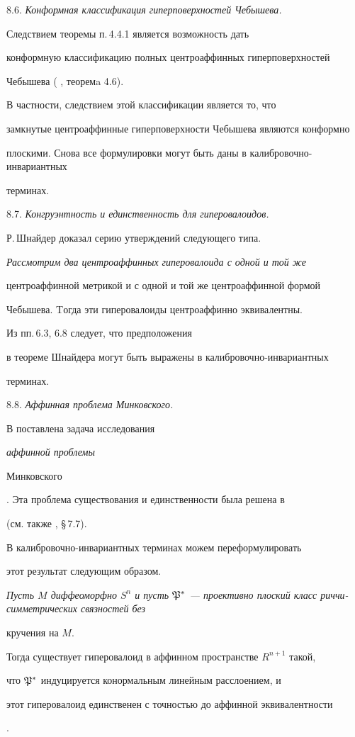 \medskip



8.6. {\it Конформная классификация гиперповерхностей Чебышева.}

Следствием теоремы п.\,4.4.1 является возможность дать

конформную классификацию полных центроаффинных гиперповерхностей

Чебышева ( \cite{LIU-S-W}, теоремa 4.6).

В частности, следствием этой классификации является то, что

замкнутые центроаффинные гиперповерхности Чебышева являются конформно

плоскими. Снова все формулировки могут быть даны в калибровочно-инвариантных

терминах.

\medskip



8.7. {\it Конгруэнтность и единственность для гиперовалоидов.}

Р.\,Шнайдер \cite {SCHN} доказал серию утверждений следующего типа.

{\it Рассмотрим два центроаффинных гиперовалоида с одной и той же

центроаффинной метрикой и с одной и той же центроаффинной формой

Чебышева. Tогда эти гиперовалоиды центроаффинно эквивалентны.}

Из пп.\,6.3, 6.8 следует, что предположения

в теореме Шнайдера могут быть выражены в калибровочно-инвариантных

терминах.

\medskip



8.8. {\it Аффинная проблема Минковского.}

В \cite{CAL-2} поставлена задача исследования {\it аффинной проблемы 

Минковского}. Эта проблема существования и единственности была решена в

\cite{PI-S-S} (см. также  \cite{SIM-5}, \S\,7.7).

В калибровочно-инвариантных терминах можем переформулировать

этот результат следующим образом.

{\it Пусть $M$ диффеоморфно $S^n$ и пусть $\frak

P^*$ --- проективно плоский класс риччи-симметрических связностей без

кручения на $M$.

Тогда существует гиперовалоид в аффинном пространстве $R^{n+1}$ такой,

что $\frak P^*$ индуцируется конормальным линейным расслоением, и

этот гиперовалоид единственен с точностью до аффинной эквивалентности}.





